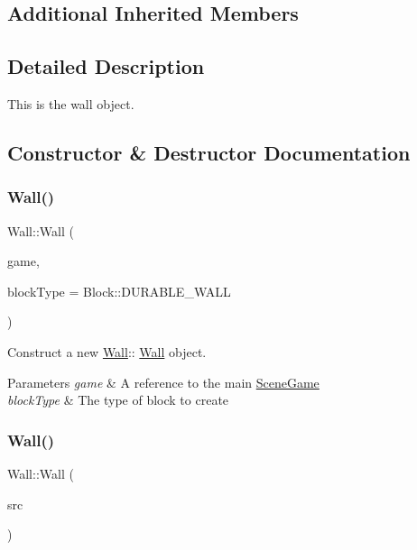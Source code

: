 \subsection*{Additional Inherited Members}


\subsection{Detailed Description}
This is the wall object. 

\subsection{Constructor \& Destructor Documentation}
\mbox{\label{class_wall_af9013d101f4409022a90b65572758b5a}} 
\subsubsection{\texorpdfstring{Wall()}{Wall()}\hspace{0.1cm}{\footnotesize\ttfamily [1/2]}}
{\footnotesize\ttfamily Wall\+::\+Wall (\begin{DoxyParamCaption}\item[{\hyperlink{class_scene_game}{Scene\+Game} \&}]{game,  }\item[{Block\+::\+Enum}]{block\+Type = {\ttfamily Block\+:\+:DURABLE\+\_\+WALL} }\end{DoxyParamCaption})\hspace{0.3cm}{\ttfamily [explicit]}}



Construct a new \hyperlink{class_wall}{Wall}\+:\+: \hyperlink{class_wall}{Wall} object. 


\begin{DoxyParams}{Parameters}
{\em game} & A reference to the main \hyperlink{class_scene_game}{Scene\+Game} \\
\hline
{\em block\+Type} & The type of block to create \\
\hline
\end{DoxyParams}
\mbox{\label{class_wall_ac4e3877605a06087babebfecbbb8a458}} 
\subsubsection{\texorpdfstring{Wall()}{Wall()}\hspace{0.1cm}{\footnotesize\ttfamily [2/2]}}
{\footnotesize\ttfamily Wall\+::\+Wall (\begin{DoxyParamCaption}\item[{\hyperlink{class_wall}{Wall} const \&}]{src }\end{DoxyParamCaption})}




